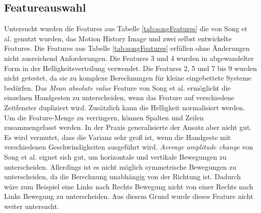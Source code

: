 \subsection{Featureauswahl}
\label{sec:feature_selection}
Untersucht wurden die Features aus Tabelle \ref{tab:songFeatures} die von Song et al. genutzt wurden, das Motion History Image und zwei selbst entwickelte Features. Die Features aus
Tabelle \ref{tab:songFeatures} erfüllen ohne Änderungen nicht ausreichend Anforderungen. Die Features 3 und 4 wurden in abgewandelter Form in der Helligkeitsverteilung verwendet.
Die Features 2, 5 und 7 bis 9 wurden nicht getestet, da sie zu komplexe Berechnungen für kleine eingebettete Systeme bedürfen.
\newline
\newline
Das \textit{Mean absolute value} Feature von Song et al. ermöglicht die einzelnen Handgesten zu unterscheiden, wenn das Feature auf verschiedene Zeitfenster dupliziert wird. Zusätzlich kann die Helligkeit
normalisiert werden. Um die Feature-Menge zu verringern, können Spalten und Zeilen zusammengefasst werden. In der Praxis generalisierte der Ansatz aber nicht gut. Es wird vermutet, dass die Varianz sehr groß
ist, wenn die Handgeste mit verschiedenen Geschwindigkeiten ausgeführt wird.
\newline
\newline
\textit{Average amplitude change} von Song et al. eignet sich gut, um horizontale und vertikale Bewegungen zu unterscheiden. Allerdings ist es nicht möglich symmetrische Bewegungen zu unterscheiden, da
die Berechnung unabhängig von der Richtung ist. Dadurch wäre zum Beispiel eine Links nach Rechts Bewegung nicht von einer Rechts nach Links Bewegung zu unterscheiden. Aus diesem Grund wurde dieses Feature nicht
weiter untersucht.


